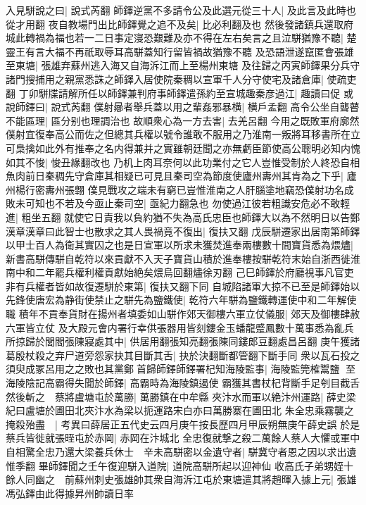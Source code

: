 入見駢說之曰|{
	說式芮翻}
師鐸逆黨不多請令公及此選元從三十人|{
	及此言及此時也從才用翻}
夜自教場門出比師鐸覺之追不及矣|{
	比必利翻及也}
然後發諸鎮兵還取府城此轉禍為福也若一二日事定寖恐艱難及亦不得在左右矣言之且泣駢猶豫不聽|{
	楚靈王有言大福不再祇取辱耳高駢蓋知行留皆禍故猶豫不聽}
及恐語泄遂竄匿會張雄至東塘|{
	張雄弃蘇州逃入海又自海泝江而上至楊州東塘}
及往歸之丙寅師鐸果分兵守諸門搜捕用之親黨悉誅之師鐸入居使院秦稠以宣軍千人分守使宅及諸倉庫|{
	使疏吏翻}
丁卯駢牒請解所任以師鐸兼判府事師鐸遣孫約至宣城趣秦彦過江|{
	趣讀曰促}
或說師鐸曰|{
	說式芮翻}
僕射曏者舉兵蓋以用之輩姦邪暴横|{
	横戶孟翻}
高令公坐自聾瞽不能區理|{
	區分别也理調治也}
故順衆心為一方去害|{
	去羌呂翻}
今用之既敗軍府廓然僕射宜復奉高公而佐之但總其兵權以號令誰敢不服用之乃淮南一叛將耳移書所在立可梟擒如此外有推奉之名内得兼并之實雖朝廷聞之亦無虧臣節使高公聰明必知内愧如其不悛|{
	悛丑緣翻改也}
乃机上肉耳奈何以此功業付之它人豈惟受制於人終恐自相魚肉前日秦稠先守倉庫其相疑已可見且秦司空為節度使廬州夀州其肯為之下乎|{
	廬州楊行密夀州張翺}
僕見戰攻之端未有窮已豈惟淮南之人肝腦塗地竊恐僕射功名成敗未可知也不若及今亟止秦司空|{
	亟紀力翻急也}
勿使過江彼若粗識安危必不敢輕進|{
	粗坐五翻}
就使它日責我以負約猶不失為高氏忠臣也師鐸大以為不然明日以告鄭漢章漢章曰此智士也散求之其人畏禍竟不復出|{
	復扶又翻}
戊辰駢遷家出居南第師鐸以甲士百人為衛其實囚之也是日宣軍以所求未獲焚進奉兩樓數十間寶貨悉為煨燼|{
	新書高駢傳駢自乾符以來貢獻不入天子寶貨山積於進奉樓按駢乾符末始自浙西徙淮南中和二年罷兵權利權貢獻始絶矣煨烏回翻燼徐刃翻}
己巳師鐸於府廳視事凡官吏非有兵權者皆如故復遷駢於東第|{
	復扶又翻下同}
自城陷諸軍大掠不已至是師鐸始以先鋒使唐宏為静街使禁止之駢先為鹽鐵使|{
	乾符六年駢為鹽鐵轉運使中和二年解使職}
積年不貢奉貨財在揚州者填委如山駢作郊天御樓六軍立仗儀服|{
	郊天及御樓肆赦六軍皆立仗}
及大殿元會内署行幸供張器用皆刻鏤金玉蟠龍蹙鳳數十萬事悉為亂兵所掠歸於閭閻張陳寢處其中|{
	供居用翻張知亮翻張陳同鏤郎豆翻處昌呂翻}
庚午獲諸葛殷杖殺之弃尸道旁怨家抉其目斷其舌|{
	抉於決翻斷都管翻下斷手同}
衆以瓦石投之須臾成冢呂用之之敗也其黨鄭首歸師鐸師鐸署杞知海陵監事|{
	海陵監筦榷鬻鹽}
至海陵陰記高霸得失聞於師鐸|{
	高霸時為海陵鎮遏使}
霸獲其書杖杞背斷手足刳目截舌然後斬之　蔡將盧塘屯於萬勝|{
	萬勝鎮在中牟縣}
夾汴水而軍以絶汴州運路|{
	薛史梁紀曰盧塘於圃田北夾汴水為梁以扼運路宋白亦曰萬勝寨在圃田北}
朱全忠乘霧襲之掩殺殆盡　|{
	考異曰薛居正五代史云四月庚午按長歷四月甲辰朔無庚午薛史誤}
於是蔡兵皆徙就張晊屯於赤岡|{
	赤岡在汴城北}
全忠復就撃之殺二萬餘人蔡人大懼或軍中自相驚全忠乃還大梁養兵休士　辛未高駢密以金遺守者|{
	駢冀守者恩之因以求出遺惟季翻}
畢師鐸聞之壬午復迎駢入道院|{
	道院高駢所起以迎神仙}
收高氏子弟甥姪十餘人同幽之　前蘇州刺史張雄帥其衆自海泝江屯於東塘遣其將趙暉入據上元|{
	張雄馮弘鐸由此得據昇州帥讀日率}
